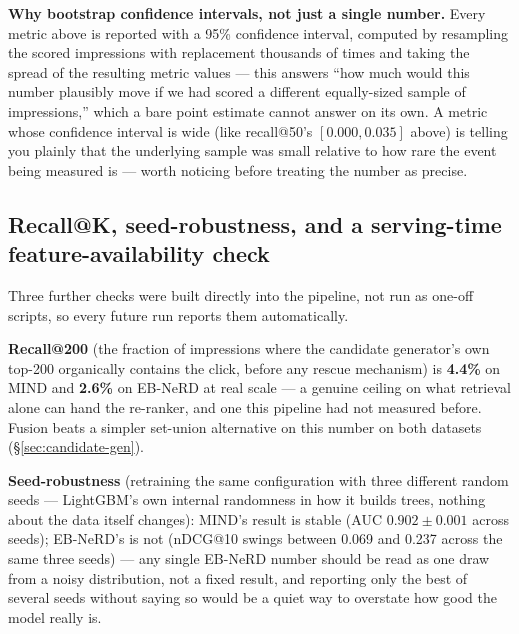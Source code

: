 \documentclass[11pt,a4paper]{article}
\begin{document}
\textbf{Why bootstrap confidence intervals, not just a single number.} Every metric above is
reported with a 95\% confidence interval, computed by resampling the scored impressions with
replacement thousands of times and taking the spread of the resulting metric values --- this
answers ``how much would this number plausibly move if we had scored a different equally-sized
sample of impressions,'' which a bare point estimate cannot answer on its own. A metric whose
confidence interval is wide (like recall@50's $[0.000, 0.035]$ above) is telling you plainly that
the underlying sample was small relative to how rare the event being measured is --- worth
noticing before treating the number as precise.

\subsection{Recall@K, seed-robustness, and a serving-time feature-availability check}

Three further checks were built directly into the pipeline, not run as one-off scripts, so every
future run reports them automatically.

\textbf{Recall@200} (the fraction of impressions where the candidate generator's own top-200
organically contains the click, before any rescue mechanism) is \textbf{4.4\%} on MIND and
\textbf{2.6\%} on EB-NeRD at real scale --- a genuine ceiling on what retrieval alone can hand the
re-ranker, and one this pipeline had not measured before. Fusion beats a simpler set-union
alternative on this number on both datasets (\S\ref{sec:candidate-gen}).

\textbf{Seed-robustness} (retraining the same configuration with three different random seeds ---
LightGBM's own internal randomness in how it builds trees, nothing about the data itself changes):
MIND's result is stable (AUC $0.902\pm0.001$ across seeds); EB-NeRD's is not (nDCG@10 swings
between 0.069 and 0.237 across the same three seeds) --- any single EB-NeRD number should be read
as one draw from a noisy distribution, not a fixed result, and reporting only the best of several
seeds without saying so would be a quiet way to overstate how good the model really is.
\end{document}
